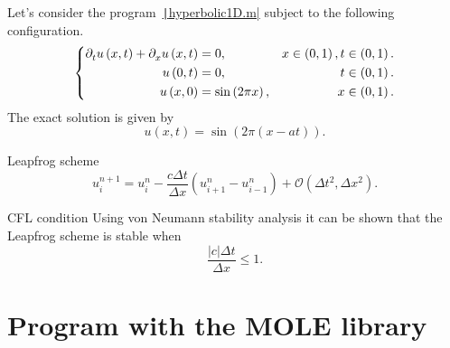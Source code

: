 \documentclass[
	8pt,
	professionalfonts,
	leqno,
	intlimits,
	c,
    aspectratio=1610,
]{beamer}
\begin{document}
\begin{frame}
    \frametitle{\secname}
    \begin{example}[Homogeneous]
        Let's consider the program~\href{https://raw.githubusercontent.com/carlosal1015/mole_examples/main/examples/octave/hyperbolic1D.m}{\texttt|hyperbolic1D.m|} subject to the following configuration.
        \begin{equation*}
            \left\{
            \begin{aligned}
                \difcp{u}{t}\left(x,t\right)+
                \difcp{u}{x}\left(x,t\right) & =
                0,                           & x\in\left(0,1\right), t\in\left(0,1\right). \\
                u\left(0,t\right)            & =
                0,                           & t\in\left(0,1\right).                       \\
                u\left(x,0\right)            & =
                \sin\left(2\pi x\right),     & x\in\left(0,1\right).
            \end{aligned}
            \right.
        \end{equation*}
        The exact solution is given by
        \begin{equation*}
            u\left(x,t\right)=\sin\left(2\pi\left(x-at\right)\right).
        \end{equation*}
    \end{example}

    \begin{block}{Leapfrog scheme}
        \begin{equation*}
            u^{n+1}_{i}=
            u^{n}_{i}-
            \frac{c\Delta t}{\Delta x}
            \left(u^{n}_{i+1}-u^{n}_{i-1}\right)+
            \mathcal{O}\left(\Delta t^{2},\Delta x^{2}\right).
        \end{equation*}
    \end{block}

    \begin{alertblock}{CFL condition}
        Using von Neumann stability analysis it can be shown that the
        Leapfrog scheme is stable when
        \begin{equation*}
            \frac{\left|c\right|\Delta t}{\Delta x}\leq 1.
        \end{equation*}
    \end{alertblock}
\end{frame}

\section{Program with the MOLE library}
\end{document}
